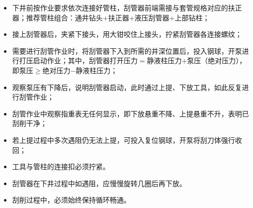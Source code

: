 \begin{itemize}
	\item 下井前按作业要求依次连接好管柱，刮管器前端需接与套管规格对应的扶正器；推荐管柱组合：通井钻头+扶正器+液压刮管器+上部钻柱；
	\item 接上刮管器后，夹紧下接头，用大钳咬住上接头，拧紧刮管器各连接螺纹；
	\item 需要进行刮管作业时，将刮管器下入到所需的井深位置后，投入钢球，开泵进行打压启动作业；其中，刮管器打开压力$=$静液柱压力$+$泵压（绝对压力），即泵压$\ge$绝对压力$-$静液柱压力；
	\item 观察泵压有下降后，说明刮管器启动，此时通过上提、下放工具，如此反复进行刮管作业；
	\item 刮管作业中观察指重表无任何显示，即下放悬重不降、上提悬重不升，表明已刮削干净；
	\item 若上提过程中多次遇阻仍无法上提，可投入复位钢球，开泵将刮刀体强行收回；
	\end{itemize}
	\begin{itemize}
		\item 工具与管柱的连接扣必须拧紧。
		\item 刮管器在下井过程中如遇阻，应慢慢旋转几圈后再下放。
		\item 刮削过程中，必须始终保持循环畅通。
	\end{itemize}
